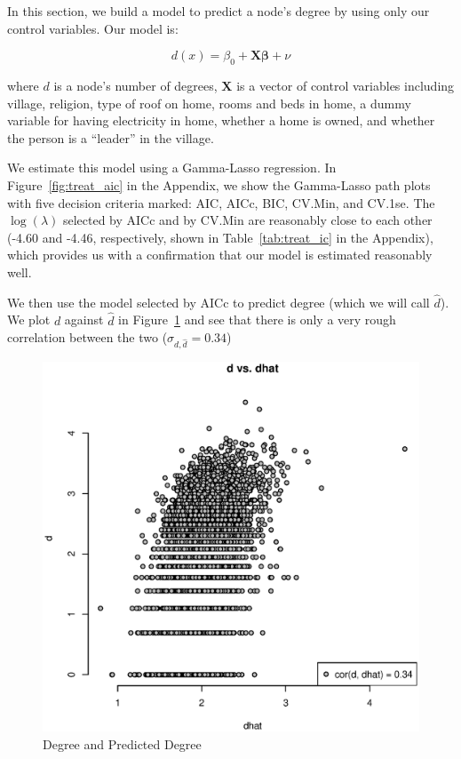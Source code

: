 \documentclass[11pt, fleqn]{article}
\begin{document}
In this section, we build a model to predict a node's degree by using only our control variables. Our model is: 

\begin{equation} \label{eq:treat}
d(x) = \beta_0 + \bm{X} \bm{\beta} + \nu
\end{equation}

where $d$ is a node's number of degrees, $\bm{X}$ is a vector of control variables including village, religion, type of roof on home, rooms and beds in home, a dummy variable for having electricity in home, whether a home is owned, and whether the person is a ``leader'' in the village. 

We estimate this model using a Gamma-Lasso regression. In Figure~\ref{fig:treat_aic} in the Appendix, we show the Gamma-Lasso path plots with five decision criteria marked: AIC, AICc, BIC, CV.Min, and CV.1se. The $\log(\lambda)$ selected by AICc and by CV.Min are reasonably close to each other (-4.60 and -4.46, respectively, shown in Table~\ref{tab:treat_ic} in the Appendix), which provides us with a confirmation that our model is estimated reasonably well.

We then use the model selected by AICc to predict degree (which we will call $\hat{d}$). We plot $d$ against $\hat{d}$ in Figure~\ref{fig:d_vs_dhat} and see that there is only a very rough correlation between the two ($\sigma_{d,\hat{d}}=0.34$)

\begin{figure}[!htb]
  \centering
  \includegraphics[scale=.5]{d_vs_dhat.eps}
  \caption{Degree and Predicted Degree}
  \label{fig:d_vs_dhat}
\end{figure}
\end{document}
